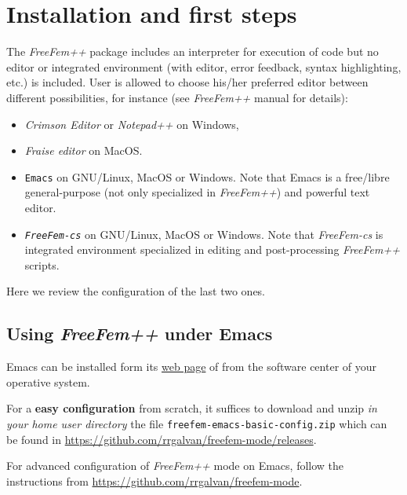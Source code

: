 \documentclass[12pt]{article}
\newcommand{\FF}{\textit{FreeFem++}\xspace}
\newcommand{\FFcs}{\textit{FreeFem-cs}\xspace}
\begin{document}
\section{Installation and first steps}
\label{sec:inst-first-steps}

The \FF package includes an interpreter for execution of code but no
editor or integrated environment (with editor, error feedback, syntax
highlighting, etc.) is included. User is allowed to choose his/her
preferred editor between different possibilities, for instance (see
\FF manual for details):

\begin{itemize}
\item \textit{Crimson Editor} or \textit{Notepad++} on Windows,
\item \textit{Fraise editor} on MacOS.
\item \texttt{Emacs} on GNU/Linux, MacOS or Windows. Note that Emacs
  is a free/libre general-purpose (not only specialized in \FF)
  and powerful text editor.
\item \texttt{\FFcs} on GNU/Linux, MacOS or Windows. Note that \FFcs
  is integrated environment specialized in editing and post-processing
  \FF scripts.
\end{itemize}




Here we review the configuration of the last two ones.

\subsection{Using \FF under Emacs}

Emacs can be installed form its
\href{https://www.gnu.org/software/emacs}{web page} of from the
software center of your operative system.

For a \textbf{easy configuration} from scratch, it suffices to
download and unzip \textit{in your home user directory} the file
\texttt{freefem-emacs-basic-config.zip} which can be found in
\url{https://github.com/rrgalvan/freefem-mode/releases}.

For advanced configuration of \FF mode on Emacs, follow the
instructions from \url{https://github.com/rrgalvan/freefem-mode}.
\end{document}
